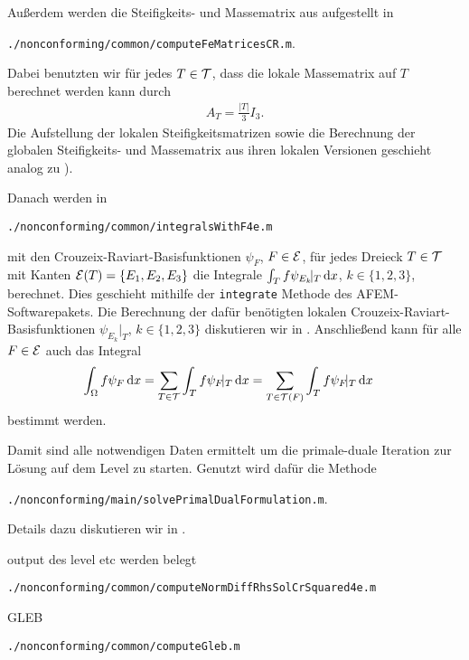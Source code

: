 Außerdem werden die Steifigkeits- und Massematrix aus
 aufgestellt in
\begin{center}
  \texttt{./nonconforming/common/computeFeMatricesCR.m}.
\end{center}
Dabei benutzten wir für jedes $T\in\mathcal{T}$, dass die lokale Massematrix auf
$T$ berechnet werden kann durch
\begin{align*}
  A_T
  =
  \frac{|T|}{3}I_3.
\end{align*}
Die Aufstellung der lokalen Steifigkeitsmatrizen sowie die Berechnung der
globalen Stei\-fig\-keits- und Massematrix aus ihren lokalen Versionen geschieht
analog zu \cite[Abschnitt 1.4.2]{CGKNRR10}).

Danach werden in
\begin{center}
  \texttt{./nonconforming/common/integralsWithF4e.m}
\end{center}
mit den Crouzeix-Raviart-Basisfunktionen
$\psi_F$, $F\in\mathcal{E}$, für jedes Dreieck $T\in\mathcal{T}$ mit Kanten
$\mathcal{E}(T)=\{E_1,E_2,E_3\}$ die Integrale $\int_T f\psi_{E_k}\!|_T\,\mathrm{d}x$,
$k\in\{1,2,3\}$, berechnet. 
Dies geschieht mithilfe der \texttt{integrate} Methode \cite[Abschnitt
1.8.2]{CGKNRR10} des AFEM-Softwarepakets.
Die Berechnung der dafür benötigten lokalen Crouzeix-Raviart-Basisfunktionen
$\psi_{E_k}\!|_T$, $k\in\{1,2,3\}$ diskutieren wir in
.
Anschließend kann für alle $F\in\mathcal{E}$ auch das Integral 
\begin{align*}
  \int_\Omega f\psi_F\,\mathrm{d}x
  &=
  \sum_{T\in\mathcal{T}}\int_T f\psi_F\!|_T\,\mathrm{d}x
  =
  \sum_{T\in\mathcal{T}(F)}\int_T f\psi_F\!|_T\,\mathrm{d}x
\end{align*}
bestimmt werden.

Damit sind alle notwendigen Daten ermittelt um die primale-duale Iteration 
zur Lösung auf dem Level zu starten. Genutzt wird dafür die Methode
\begin{center}
  \texttt{./nonconforming/main/solvePrimalDualFormulation.m}.
\end{center}
Details dazu diskutieren wir in .


\bigskip output des level etc werden belegt

\bigskip
\begin{center}
  \texttt{./nonconforming/common/computeNormDiffRhsSolCrSquared4e.m}
\end{center}


\bigskip GLEB
\begin{center}
  \texttt{./nonconforming/common/computeGleb.m}
\end{center}

